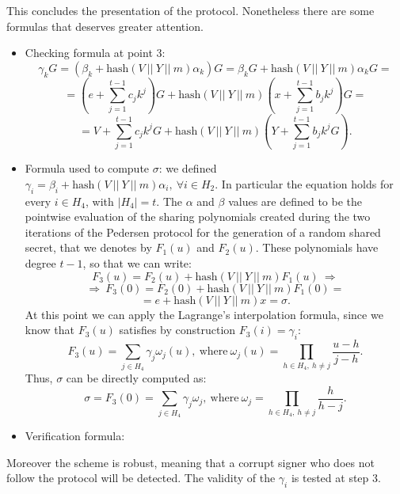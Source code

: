 This concludes the presentation of the protocol. Nonetheless there are some formulas that deserves greater attention.
\begin{itemize}
	\item Checking formula at point 3: 
	$$\gamma_kG = (\beta_k + \text{hash}(V \ || \ Y \ || \ m)\alpha_k)G = \beta_kG + \text{hash}(V \ || \ Y \ || \ m)\alpha_kG = $$
	$$= \left(e + \sum_{j = 1}^{t - 1}c_jk^j\right)G + \text{hash}(V \ || \ Y \ || \ m)\left(x + \sum_{j = 1}^{t - 1}b_jk^j\right)G =$$
	$$= V + \sum_{j = 1}^{t - 1}c_jk^jG + \text{hash}(V \ || \ Y \ || \ m)\left(Y + \sum_{j = 1}^{t - 1}b_jk^jG\right).$$
	\item Formula used to compute $\sigma$: we defined $\gamma_i = \beta_i + \text{hash}(V \ || \ Y \ || \ m)\alpha_i, \ \forall i \in H_2$. In particular the equation holds for every $i \in H_4$, with $|H_4| = t$. The $\alpha$ and $\beta$ values are defined to be the pointwise evaluation of the sharing polynomials created during the two iterations of the Pedersen protocol for the generation of a random shared secret, that we denotes by $F_1(u)$ and $F_2(u)$. These polynomials have degree $t - 1$, so that we can write:
	$$F_3(u) = F_2(u) + \text{hash}(V \ || \ Y \ || \ m)F_1(u) \ \Longrightarrow $$
	$$\Longrightarrow \ F_3(0) = F_2(0) + \text{hash}(V \ || \ Y \ || \ m)F_1(0) = $$
	$$= e + \text{hash}(V \ || \ Y \ || \ m)x = \sigma.$$
	At this point we can apply the Lagrange's interpolation formula, since we know that $F_3(u)$ satisfies by construction $F_3(i) = \gamma_i$:
	$$F_3(u) = \sum_{j \in H_4}\gamma_j\omega_j(u), \ \text{where} \ \omega_j(u) = \prod_{h \in H_4, \ h \neq j}\frac{u - h}{j -h}.$$
	Thus, $\sigma$ can be directly computed as:
	$$\sigma = F_3(0) = \sum_{j \in H_4}\gamma_j\omega_j, \ \text{where} \ \omega_j = \prod_{h \in H_4, \ h \neq j}\frac{h}{h - j}.$$
	\item Verification formula: 
\end{itemize}
Moreover the scheme is robust, meaning that a corrupt signer who does not follow the protocol will be detected. The validity of the $\gamma_i$ is tested at step 3.